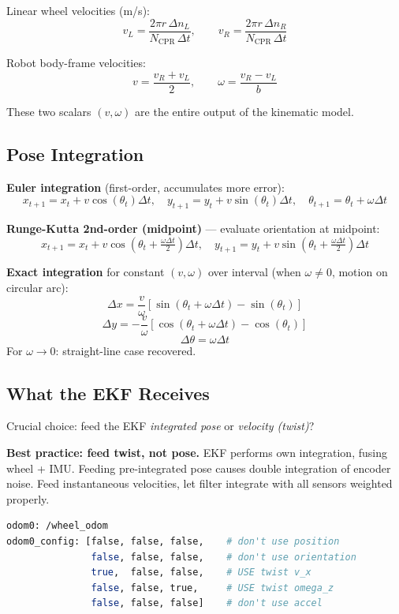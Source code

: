 \documentclass[11pt,a4paper]{article}
\begin{document}
Linear wheel velocities (m/s):
\[
v_L = \frac{2\pi r\, \Delta n_L}{N_{\text{CPR}}\, \Delta t}, \qquad v_R = \frac{2\pi r\, \Delta n_R}{N_{\text{CPR}}\, \Delta t}
\]

Robot body-frame velocities:
\begin{equation}
\boxed{\;v = \frac{v_R + v_L}{2}, \qquad \omega = \frac{v_R - v_L}{b}\;}
\end{equation}

These two scalars $(v, \omega)$ are the entire output of the kinematic model.

\subsection{Pose Integration}

\textbf{Euler integration} (first-order, accumulates more error):
\[
x_{t+1} = x_t + v\cos(\theta_t)\Delta t, \quad y_{t+1} = y_t + v\sin(\theta_t)\Delta t, \quad \theta_{t+1} = \theta_t + \omega\Delta t
\]

\textbf{Runge-Kutta 2nd-order (midpoint)} --- evaluate orientation at midpoint:
\[
x_{t+1} = x_t + v\cos\!\left(\theta_t + \tfrac{\omega\Delta t}{2}\right)\Delta t, \quad y_{t+1} = y_t + v\sin\!\left(\theta_t + \tfrac{\omega\Delta t}{2}\right)\Delta t
\]

\textbf{Exact integration} for constant $(v, \omega)$ over interval (when $\omega \neq 0$, motion on circular arc):
\[
\Delta x = \frac{v}{\omega}[\sin(\theta_t + \omega\Delta t) - \sin(\theta_t)]
\]
\[
\Delta y = -\frac{v}{\omega}[\cos(\theta_t + \omega\Delta t) - \cos(\theta_t)]
\]
\[
\Delta \theta = \omega \Delta t
\]
For $\omega \to 0$: straight-line case recovered.

\subsection{What the EKF Receives}

Crucial choice: feed the EKF \emph{integrated pose} or \emph{velocity (twist)}?

\textbf{Best practice: feed twist, not pose.} EKF performs own integration, fusing wheel + IMU. Feeding pre-integrated pose causes double integration of encoder noise. Feed instantaneous velocities, let filter integrate with all sensors weighted properly.

\begin{lstlisting}[language=bash]
odom0: /wheel_odom
odom0_config: [false, false, false,    # don't use position
               false, false, false,    # don't use orientation
               true,  false, false,    # USE twist v_x
               false, false, true,     # USE twist omega_z
               false, false, false]    # don't use accel
\end{lstlisting}
\end{document}
